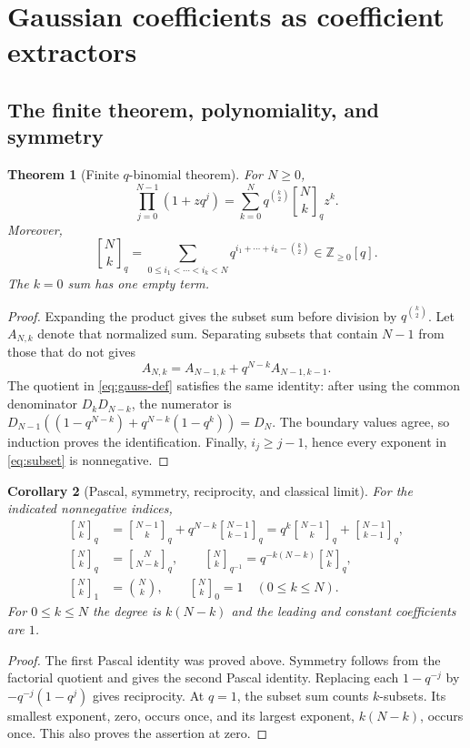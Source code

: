 \documentclass[11pt,a4paper]{article}
\numberwithin{equation}{section}
\newtheorem{theorem}{Theorem}[section]
\newtheorem{corollary}[theorem]{Corollary}
\theoremstyle{definition}
\theoremstyle{remark}
\newcommand{\Z}{\mathbb Z}
\newcommand{\qb}[2]{\genfrac{[}{]}{0pt}{}{#1}{#2}_{q}}
\newcommand{\qbb}[3]{\genfrac{[}{]}{0pt}{}{#1}{#2}_{#3}}
\begin{document}
\section{Gaussian coefficients as coefficient extractors}\label{sec:gaussian}

\subsection{The finite theorem, polynomiality, and symmetry}
\begin{theorem}[Finite $q$-binomial theorem]\label{thm:finite}
For $N\ge0$,
\begin{equation}\label{eq:finite}
 \prod_{j=0}^{N-1}(1+zq^j)
 =\sum_{k=0}^{N}q^{\binom k2}\qb Nk z^k.
\end{equation}
Moreover,
\begin{equation}\label{eq:subset}
 \qb Nk=\sum_{0\le i_1<\cdots<i_k<N}
          q^{i_1+\cdots+i_k-\binom k2}\in\Z_{\ge0}[q].
\end{equation}
The $k=0$ sum has one empty term.
\end{theorem}
\begin{proof}
Expanding the product gives the subset sum before division by $q^{\binom k2}$.
Let $A_{N,k}$ denote that normalized sum. Separating subsets that contain $N-1$
from those that do not gives
\[
 A_{N,k}=A_{N-1,k}+q^{N-k}A_{N-1,k-1}.
\]
The quotient in \eqref{eq:gauss-def} satisfies the same identity: after using the
common denominator $D_kD_{N-k}$, the numerator is
$D_{N-1}((1-q^{N-k})+q^{N-k}(1-q^k))=D_N$.
The boundary values agree, so induction proves the identification. Finally,
$i_j\ge j-1$, hence every exponent in \eqref{eq:subset} is nonnegative.
\end{proof}

\begin{corollary}[Pascal, symmetry, reciprocity, and classical limit]\label{cor:pascal}
For the indicated nonnegative indices,
\begin{align}
 \qb Nk&=\qb{N-1}k+q^{N-k}\qb{N-1}{k-1}
       =q^k\qb{N-1}k+\qb{N-1}{k-1},\label{eq:pascal}\\
 \qb Nk&=\qb N{N-k},\qquad
 \qbb Nk{q^{-1}}=q^{-k(N-k)}\qb Nk,\label{eq:reciprocity}\\
 \qbb Nk1&=\binom Nk,\qquad \qbb Nk0=1\quad(0\le k\le N).
 \label{eq:specializations}
\end{align}
For $0\le k\le N$ the degree is $k(N-k)$ and the leading and constant
coefficients are $1$.
\end{corollary}
\begin{proof}
The first Pascal identity was proved above. Symmetry follows from the factorial
quotient and gives the second Pascal identity. Replacing each $1-q^{-j}$ by
$-q^{-j}(1-q^j)$ gives reciprocity. At $q=1$, the subset sum counts $k$-subsets.
Its smallest exponent, zero, occurs once, and its largest exponent,
$k(N-k)$, occurs once. This also proves the assertion at zero.
\end{proof}
\end{document}
